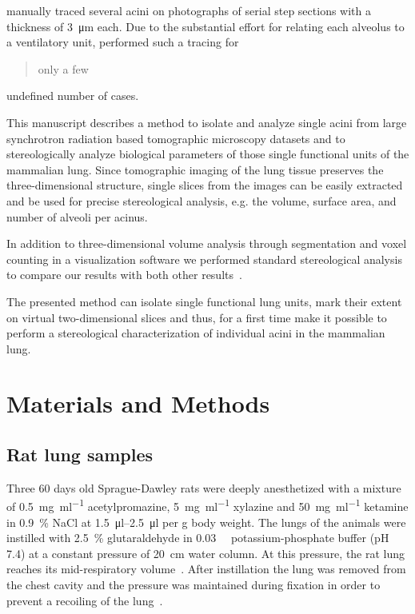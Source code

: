 \documentclass[a4paper,DIV=calc,abstract,english]{scrartcl}
\begin{document}
\citet{Mercer1987a} manually traced several acini on photographs of serial step sections with a thickness of \SI{3}{\micro\meter} each.
Due to the substantial effort for relating each alveolus to a ventilatory unit, \citeauthor{Mercer1987a} performed such a tracing for \blockquote{only a few} undefined number of cases.

This manuscript describes a method to isolate and analyze single acini from large synchrotron radiation based tomographic microscopy datasets and to stereologically analyze biological parameters of those single functional units of the mammalian lung.
Since tomographic imaging of the lung tissue preserves the three-dimensional structure, single slices from the images can be easily extracted and be used for precise stereological analysis, e.g. the volume, surface area, and number of alveoli per acinus.

In addition to three-dimensional volume analysis through segmentation and voxel counting in a visualization software we performed standard stereological analysis~\cite{Hsia2010} to compare our results with both other results~\cite{Rodriguez1987,Tschanz2003,Mercer1987a}.

The presented method can isolate single functional lung units, mark their extent on virtual two-dimensional slices and thus, for a first time make it possible to perform a stereological characterization of individual acini in the mammalian lung.

\section{Materials and Methods}
\label{sec:materials and methods}
\subsection{Rat lung samples}
Three 60 days old Sprague-Dawley rats were deeply anesthetized with a mixture of %
\SI{0.5}{\milli\gram\per\milli\litre} acetylpromazine, %
\SI{5}{\milli\gram\per\milli\litre} xylazine and %
\SI{50}{\milli\gram\per\milli\litre} ketamine in %
\SI{0.9}{\percent} NaCl at \SIrange{1.5}{2.5}{\micro\litre} per \si{\gram} body weight.
The lungs of the animals were instilled with \SI{2.5}{\percent} glutaraldehyde in \SI{0.03}{\milli\Molar} potassium-phosphate buffer (pH 7.4) at a constant pressure of \SI{20}{\centi\meter} water column.
At this pressure, the rat lung reaches its mid-respiratory volume~\cite{Schittny1998}.
After instillation the lung was removed from the chest cavity and the pressure was maintained during fixation in order to prevent a recoiling of the lung~\cite{Mund2008}.
\end{document}
